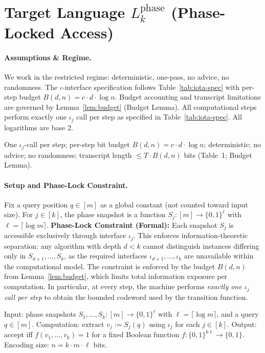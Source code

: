 \section{Target Language \texorpdfstring{$L_k^{\text{phase}}$}{Lkphase} (Phase-Locked Access)}
\label{Lkphase:sec}

\paragraph{Assumptions \& Regime.}
We work in the restricted regime: deterministic, one-pass, no advice, no randomness. The $\iota$-interface specification follows Table~\ref{tab:iota-spec} with per-step budget $B(d,n) = c \cdot d \cdot \log n$. Budget accounting and transcript limitations are governed by Lemma~\ref{lem:budget} (Budget Lemma). All computational steps perform exactly one $\iota_j$ call per step as specified in Table~\ref{tab:iota-spec}. All logarithms are base 2.

\begin{tcolorbox}[title=Mini-Recap, colback=white]
One $\iota_j$-call per step; per-step bit budget $B(d,n)=c\cdot d\cdot \log n$; deterministic; no advice; no randomness; transcript length $\le T\cdot B(d,n)$ bits (Table~1; Budget Lemma).
\end{tcolorbox}

\paragraph{Setup and Phase-Lock Constraint.}
Fix a query position $q\in[m]$ as a global constant (not counted toward input size). For $j\in[k]$, the phase snapshot is a function $S_j:[m]\to\{0,1\}^{\ell}$ with $\ell=\lceil\log m\rceil$. \textbf{Phase-Lock Constraint (Formal):} Each snapshot $S_j$ is accessible exclusively through interface $\iota_j$. This enforces information-theoretic separation: any algorithm with depth $d<k$ cannot distinguish instances differing only in $S_{d+1},\ldots,S_k$, as the required interfaces $\iota_{d+1},\ldots,\iota_k$ are unavailable within the computational model. The constraint is enforced by the budget $B(d,n)$ from Lemma~\ref{lem:budget}, which limits total information exposure per computation. In particular, at every step, the machine performs \emph{exactly one $\iota_j$ call per step} to obtain the bounded codeword used by the transition function.

\begin{definition}
\label{Lkphase:def:language}
Input: phase snapshots $S_1,\ldots,S_k:[m]\to\{0,1\}^{\ell}$ with $\ell=\lceil\log m\rceil$, and a query $q\in[m]$. Computation: extract $v_j:=S_j(q)$ using $\iota_j$ for each $j\in[k]$. Output: accept iff $f(v_1,\ldots,v_k)=1$ for a fixed Boolean function $f:\{0,1\}^{k\ell}\to\{0,1\}$. Encoding size: $n=k\cdot m\cdot \ell$ bits.
\end{definition}


